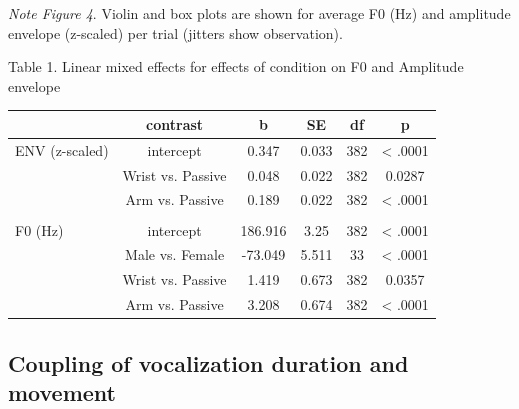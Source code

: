 \documentclass[
  man,floatsintext]{apa6}
\begin{document}
\emph{Note Figure 4}. Violin and box plots are shown for average F0 (Hz) and amplitude envelope (z-scaled) per trial (jitters show observation).

\pagebreak

Table 1. Linear mixed effects for effects of condition on F0 and Amplitude envelope

\begin{tabular}{lccccc}
\toprule
  & contrast & b & SE & df & p\\
\midrule
ENV (z-scaled) & intercept & 0.347 & 0.033 & 382 & < .0001\\
 & Wrist vs. Passive & 0.048 & 0.022 & 382 & 0.0287\\
 & Arm vs. Passive & 0.189 & 0.022 & 382 & < .0001\\
 &  &  &  &  & \\
F0 (Hz) & intercept & 186.916 & 3.25 & 382 & < .0001\\
\addlinespace
 & Male vs. Female & -73.049 & 5.511 & 33 & < .0001\\
 & Wrist vs. Passive & 1.419 & 0.673 & 382 & 0.0357\\
 & Arm vs. Passive & 3.208 & 0.674 & 382 & < .0001\\
\bottomrule
\end{tabular}

\hypertarget{coupling-of-vocalization-duration-and-movement}{%
\subsection{Coupling of vocalization duration and movement}\label{coupling-of-vocalization-duration-and-movement}}
\end{document}

